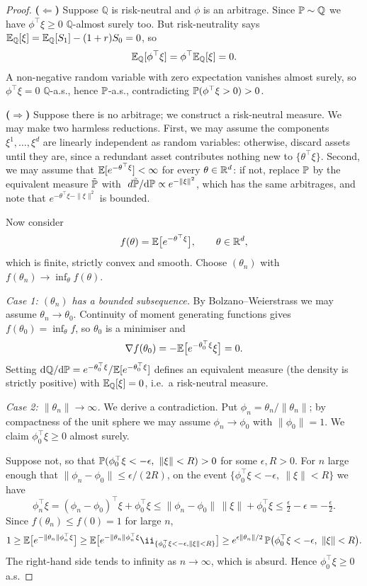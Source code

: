 \documentclass[a4paper]{scrartcl}
\newcommand{\QQ}{\mathbb{Q}}
\newcommand{\dP}{\mathrm{d}\PP}
\newcommand{\dQ}{\mathrm{d}\QQ}
\begin{document}
\begin{proof}
	\textbf{($\Leftarrow$)} Suppose $\QQ$ is risk-neutral and $\phi$ is an arbitrage. Since $\PP \sim \QQ$ we have $\phi^\top \xi \geq 0$ $\QQ$-almost surely too. But risk-neutrality says $\EE_\QQ[\xi] = \EE_\QQ[S_1] - (1+r)S_0 = 0$, so
	$$
	\EE_\QQ[\phi^\top \xi] = \phi^\top \EE_\QQ[\xi] = 0.
	$$
	A non-negative random variable with zero expectation vanishes almost surely, so $\phi^\top\xi = 0$ $\QQ$-a.s., hence $\mathbb{P}$-a.s., contradicting $\mathbb{P}(\phi^\top\xi > 0) > 0$.

	\textbf{($\Rightarrow$)} Suppose there is no arbitrage; we construct a risk-neutral measure. We may make two harmless reductions. First, we may assume the components $\xi^1,\dots,\xi^d$ are linearly independent as random variables: otherwise, discard assets until they are, since a redundant asset contributes nothing new to $\{\theta^\top \xi\}$. Second, we may assume that $\mathbb{E}[e^{-\theta^\top \xi}] < \infty$ for every $\theta \in \mathbb{R}^d$: if not, replace $\mathbb{P}$ by the equivalent measure $\tilde{\mathbb{P}}$ with $\dd\tilde\PP/\dP \propto e^{-\|\xi\|^2}$, which has the same arbitrages, and note that $e^{-\theta^\top\xi - \|\xi\|^2}$ is bounded.

	Now consider
	$$
	f(\theta) = \mathbb{E}\big[e^{-\theta^\top \xi}\big], \qquad \theta \in \mathbb{R}^d,
	$$
	which is finite, strictly convex and smooth. Choose $(\theta_n)$ with $f(\theta_n) \to \inf_\theta f(\theta)$.

	\emph{Case 1: $(\theta_n)$ has a bounded subsequence.} By Bolzano--Weierstrass we may assume $\theta_n \to \theta_0$. Continuity of moment generating functions gives $f(\theta_0) = \inf_\theta f$, so $\theta_0$ is a minimiser and
	$$
	\nabla f(\theta_0) = -\mathbb{E}\big[e^{-\theta_0^\top \xi}\xi\big] = 0.
	$$
	Setting $\dQ/\dP = e^{-\theta_0^\top\xi}/\EE[e^{-\theta_0^\top \xi}]$ defines an equivalent measure (the density is strictly positive) with $\EE_\QQ[\xi] = 0$, i.e.\ a risk-neutral measure.

	\emph{Case 2: $\|\theta_n\| \to \infty$.} We derive a contradiction. Put $\phi_n = \theta_n/\|\theta_n\|$; by compactness of the unit sphere we may assume $\phi_n \to \phi_0$ with $\|\phi_0\| = 1$. We claim $\phi_0^\top \xi \geq 0$ almost surely.

	Suppose not, so that $\mathbb{P}(\phi_0^\top \xi < -\epsilon,\ \|\xi\| < R) > 0$ for some $\epsilon, R > 0$. For $n$ large enough that $\|\phi_n - \phi_0\| \leq \epsilon/(2R)$, on the event $\{\phi_0^\top\xi < -\epsilon,\ \|\xi\| < R\}$ we have
	$$
	\phi_n^\top \xi = (\phi_n - \phi_0)^\top \xi + \phi_0^\top \xi \leq \|\phi_n - \phi_0\|\,\|\xi\| + \phi_0^\top \xi \leq \tfrac{\epsilon}{2} - \epsilon = -\tfrac{\epsilon}{2}.
	$$
	Since $f(\theta_n) \le f(0) = 1$ for large $n$,
	$$
	1 \geq \EE\big[e^{-\|\theta_n\|\phi_n^\top \xi}\big] \geq \EE\big[e^{-\|\theta_n\|\phi_n^\top\xi}\ii_{\{\phi_0^\top\xi<-\epsilon,\|\xi\|<R\}}\big] \geq e^{\epsilon\|\theta_n\|/2}\,\PP\big(\phi_0^\top \xi < -\epsilon,\ \|\xi\| < R\big).
	$$
	The right-hand side tends to infinity as $n \to \infty$, which is absurd. Hence $\phi_0^\top \xi \geq 0$ a.s.


\end{proof}
\end{document}
